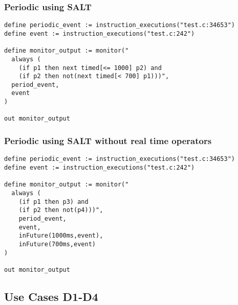 \subsubsection{Periodic using SALT}

\begin{lstlisting}
define periodic_event := instruction_executions("test.c:34653")
define event := instruction_executions("test.c:242")

define monitor_output := monitor("
  always (
    (if p1 then next timed[<= 1000] p2) and 
    (if p2 then not(next timed[< 700] p1)))",
  period_event,
  event
)

out monitor_output
\end{lstlisting}






\subsubsection{Periodic using SALT without real time operators}

\begin{lstlisting}
define periodic_event := instruction_executions("test.c:34653")
define event := instruction_executions("test.c:242")

define monitor_output := monitor("
  always (
    (if p1 then p3) and 
    (if p2 then not(p4)))",
    period_event,
    event,
    inFuture(1000ms,event),
    inFuture(700ms,event)
)

out monitor_output
\end{lstlisting}

\subsection{Use Cases D1-D4}

